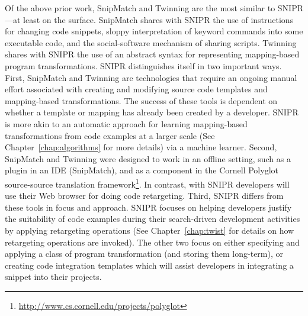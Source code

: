 Of the above prior work, SnipMatch and Twinning are the most similar to \uppercase{SnipR}---at least on the surface. SnipMatch shares with \uppercase{SnipR} the use of instructions for changing code snippets, sloppy interpretation of keyword commands into some executable code, and the social-software mechanism of sharing scripts. Twinning shares with \uppercase{SnipR} the use of an abstract syntax for representing mapping-based program transformations. \uppercase{SnipR} distinguishes itself in two important ways. First, SnipMatch and Twinning are technologies that require an ongoing manual effort associated with creating and modifying source code templates and mapping-based transformations. The success of these tools is dependent on whether a template or mapping has already been created by a developer. \uppercase{SnipR} is more akin to an automatic approach for learning mapping-based transformations from code examples at a larger scale (See Chapter~\ref{chap:algorithms} for more details) via a machine learner. Second, SnipMatch and Twinning were designed to work in an offline setting, such as a plugin in an IDE (SnipMatch), and as a component in the Cornell Polyglot source-source translation framework\footnote{\url{http://www.cs.cornell.edu/projects/polyglot}}. In contrast, with \uppercase{SnipR} developers will use their Web browser for doing code retargeting. Third, \uppercase{SnipR} differs from these tools in focus and approach. \uppercase{SnipR} focuses on helping developers justify the suitability of code examples during their search-driven development activities by applying retargeting operations (See Chapter~\ref{chap:twist} for details on how retargeting operations are invoked). The other two focus on either specifying and applying a class of program transformation (and storing them long-term), or creating code integration templates which will assist developers in integrating a snippet into their projects.  
